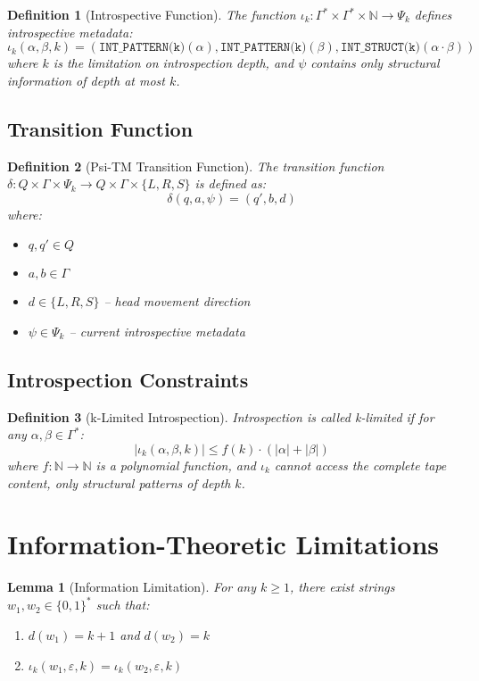 \documentclass[11pt]{article}
\newtheorem{definition}{Definition}
\newtheorem{lemma}{Lemma}
\begin{document}
\begin{definition}[Introspective Function]
The function $\iota_k: \Gamma^* \times \Gamma^* \times \mathbb{N} \to \Psi_k$ defines introspective metadata:
$$\iota_k(\alpha, \beta, k) = (\texttt{INT\_PATTERN(k)}(\alpha), \texttt{INT\_PATTERN(k)}(\beta), \texttt{INT\_STRUCT(k)}(\alpha \cdot \beta))$$
where $k$ is the limitation on introspection depth, and $\psi$ contains only structural information of depth at most $k$.
\end{definition}

\subsection{Transition Function}

\begin{definition}[Psi-TM Transition Function]
The transition function $\delta: Q \times \Gamma \times \Psi_k \to Q \times \Gamma \times \{L, R, S\}$ is defined as:
$$\delta(q, a, \psi) = (q', b, d)$$
where:
\begin{itemize}
\item $q, q' \in Q$
\item $a, b \in \Gamma$
\item $d \in \{L, R, S\}$ -- head movement direction
\item $\psi \in \Psi_k$ -- current introspective metadata
\end{itemize}
\end{definition}

\subsection{Introspection Constraints}

\begin{definition}[k-Limited Introspection]
Introspection is called k-limited if for any $\alpha, \beta \in \Gamma^*$:
$$|\iota_k(\alpha, \beta, k)| \leq f(k) \cdot (|\alpha| + |\beta|)$$
where $f: \mathbb{N} \to \mathbb{N}$ is a polynomial function, and $\iota_k$ cannot access the complete tape content, only structural patterns of depth $k$.
\end{definition}

\section{Information-Theoretic Limitations}

\begin{lemma}[Information Limitation]
For any $k \geq 1$, there exist strings $w_1, w_2 \in \{0,1\}^*$ such that:
\begin{enumerate}
\item $d(w_1) = k+1$ and $d(w_2) = k$
\item $\iota_k(w_1, \varepsilon, k) = \iota_k(w_2, \varepsilon, k)$
\end{enumerate}
\end{lemma}
\end{document}
